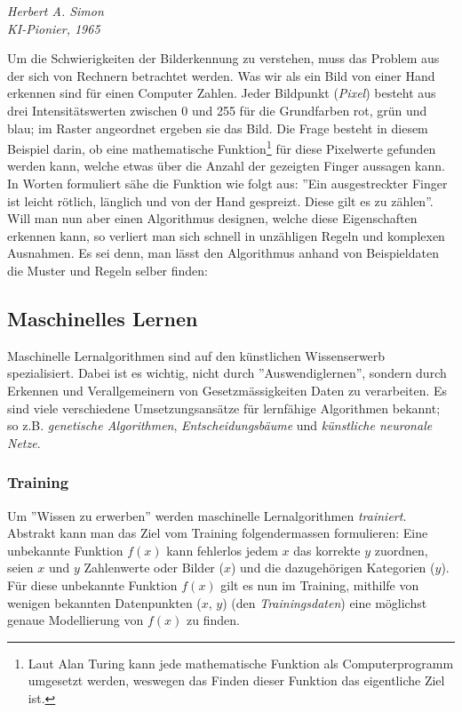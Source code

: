 \epigraph{\cite{hasimon}}{\textit{Herbert A. Simon\\ \textit{KI}-Pionier, 1965}}

Um die Schwierigkeiten der Bilderkennung zu verstehen, muss das Problem aus der sich von Rechnern betrachtet werden. Was wir als ein Bild von einer Hand erkennen sind für einen Computer Zahlen. Jeder Bildpunkt (\textit{Pixel}) besteht aus drei Intensitätswerten zwischen 0 und 255 für die Grundfarben rot, grün und blau; im Raster angeordnet ergeben sie das Bild. Die Frage besteht in diesem Beispiel darin, ob eine mathematische Funktion\footnote{Laut Alan Turing kann jede mathematische Funktion als Computerprogramm umgesetzt werden\cite{alanturing}, weswegen das Finden dieser Funktion das eigentliche Ziel ist.} für diese Pixelwerte gefunden werden kann, welche etwas über die Anzahl der gezeigten Finger aussagen kann. In Worten formuliert sähe die Funktion wie folgt aus: ''Ein ausgestreckter Finger ist leicht rötlich, länglich und von der Hand gespreizt. Diese gilt es zu zählen''. Will man nun aber einen Algorithmus designen, welche diese Eigenschaften erkennen kann, so verliert man sich schnell in unzähligen Regeln und komplexen Ausnahmen. Es sei denn, man lässt den Algorithmus anhand von Beispieldaten die Muster und Regeln selber finden:

\subsection{Maschinelles Lernen}\label{cha:theo:ml}
Maschinelle Lernalgorithmen sind auf den künstlichen Wissenserwerb spezialisiert. Dabei ist es wichtig, nicht durch ''Auswendiglernen'', sondern durch Erkennen und Verallgemeinern von Gesetzmässigkeiten Daten zu verarbeiten. Es sind viele verschiedene Umsetzungsansätze für lernfähige Algorithmen bekannt; so z.B. \textit{genetische Algorithmen}, \textit{Entscheidungsbäume} und \textit{künstliche neuronale Netze}.

\subsubsection{Training}\label{cha:theo:ml:training}
Um ''Wissen zu erwerben'' werden maschinelle Lernalgorithmen \textit{trainiert}. Abstrakt kann man das Ziel vom Training folgendermassen formulieren: Eine unbekannte Funktion $f(x)$ kann fehlerlos jedem $x$ das korrekte $y$ zuordnen, seien $x$ und $y$ Zahlenwerte oder Bilder ($x$) und die dazugehörigen Kategorien ($y$). Für diese unbekannte Funktion $f(x)$  gilt es nun im Training, mithilfe von wenigen bekannten Datenpunkten ($x$, $y$) (den \textit{Trainingsdaten}) eine möglichst genaue Modellierung von $f(x)$ zu finden.

